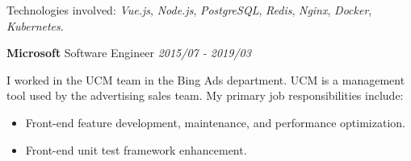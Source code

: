 \documentclass[a4paper]{article}
\newenvironment{changemargin}[2]{%
  \begin{list}{}{%
    \setlength{\topsep}{0pt}%
    \setlength{\leftmargin}{#1}%
    \setlength{\rightmargin}{#2}%
    \setlength{\listparindent}{\parindent}%
    \setlength{\itemindent}{\parindent}%
    \setlength{\parsep}{\parskip}%
  }%
  \item[]}{\end{list}
}
\newenvironment{body} {
	\vspace*{-16pt}
	\begin{changemargin}{-0.5in}{-0.5in}
  }
	{\end{changemargin}
}
\begin{document}
\begin{body}


	\smallskip
	Technologies involved: \emph{Vue.js}, \emph{Node.js}, \emph{PostgreSQL}, \emph{Redis}, \emph{Nginx}, \emph{Docker}, \emph{Kubernetes}.

	\medskip

	\textbf{Microsoft} \hfill Software Engineer \emph{2015/07 - 2019/03} \\

	\begin{justify}
		I worked in the UCM team in the Bing Ads department. UCM is a management tool used by the advertising sales team. My primary job responsibilities include:
	\end{justify} 

	\smallskip

	\vspace*{-8pt}
	\begin{itemize} \itemsep -0pt  %
		\item \begin{justify} 
			Front-end feature development, maintenance, and performance optimization.
		\end{justify} 
	\end{itemize}

	\vspace*{-8pt}
	\begin{itemize} \itemsep -0pt  %
		\item \begin{justify}
			Front-end unit test framework enhancement.
		\end{justify}
	\end{itemize}


\end{body}
\end{document}
